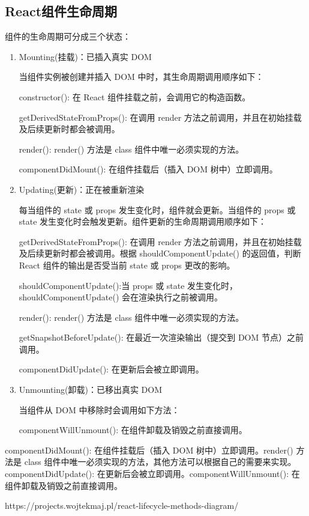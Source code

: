 \documentclass[../../../interview-questions.tex]{subfiles}
\begin{document}
\subsection{React组件生命周期}

组件的生命周期可分成三个状态：

\begin{enumerate}
\item{Mounting(挂载)：已插入真实 DOM}

当组件实例被创建并插入 DOM 中时，其生命周期调用顺序如下：


constructor(): 在 React 组件挂载之前，会调用它的构造函数。

getDerivedStateFromProps(): 在调用 render 方法之前调用，并且在初始挂载及后续更新时都会被调用。

render(): render() 方法是 class 组件中唯一必须实现的方法。

componentDidMount(): 在组件挂载后（插入 DOM 树中）立即调用。


\item{Updating(更新)：正在被重新渲染}

每当组件的 state 或 props 发生变化时，组件就会更新。当组件的 props 或 state 发生变化时会触发更新。组件更新的生命周期调用顺序如下：

getDerivedStateFromProps(): 在调用 render 方法之前调用，并且在初始挂载及后续更新时都会被调用。根据 shouldComponentUpdate() 的返回值，判断 React 组件的输出是否受当前 state 或 props 更改的影响。

shouldComponentUpdate():当 props 或 state 发生变化时，shouldComponentUpdate() 会在渲染执行之前被调用。

render(): render() 方法是 class 组件中唯一必须实现的方法。

getSnapshotBeforeUpdate(): 在最近一次渲染输出（提交到 DOM 节点）之前调用。

componentDidUpdate(): 在更新后会被立即调用。

\item{Unmounting(卸载)：已移出真实 DOM}

当组件从 DOM 中移除时会调用如下方法：

componentWillUnmount(): 在组件卸载及销毁之前直接调用。

\end{enumerate}

componentDidMount(): 在组件挂载后（插入 DOM 树中）立即调用。render() 方法是 class 组件中唯一必须实现的方法，其他方法可以根据自己的需要来实现。componentDidUpdate(): 在更新后会被立即调用。componentWillUnmount(): 在组件卸载及销毁之前直接调用。

https://projects.wojtekmaj.pl/react-lifecycle-methods-diagram/
\end{document}
